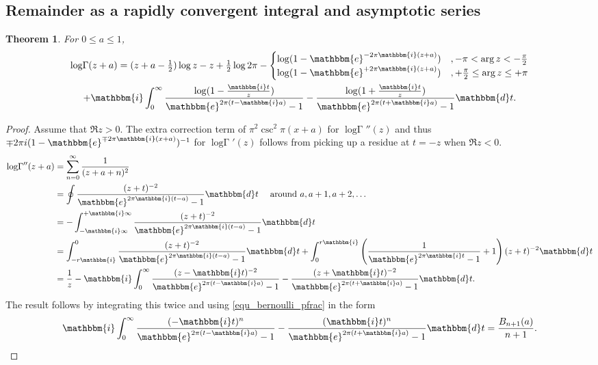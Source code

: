 \documentclass[12pt]{article}
\newcommand{\ee}[0] {\mathbbm{e}}
\newcommand{\ii}[0] {\mathbbm{i}}
\newcommand{\dd}[0] {\mathbbm{d}}
\newcommand{\op}[1]  { \operatorname{ #1 }}
\newcommand{\logG} {\operatorname {log \Gamma}}
\numberwithin{equation}{section}
\newtheorem{theorem}{Theorem}[section]
\begin{document}
\subsection{Remainder as a rapidly convergent integral and asymptotic series}
\begin{theorem}
For $0 \le a \le 1$,
\begin{gather*}
\logG(z+a) = (z+a-\tfrac{1}{2}) \log z - z + \tfrac{1}{2} \log 2\pi- \begin{cases} \log(1-\ee^{-2\pi \ii (z+a)})&, - \pi < \op{arg} z < -\frac{\pi}{2}\\
 \log(1-\ee^{+2\pi \ii (z+a)})&, +\frac{\pi}{2} \le \op{arg} z \le +\pi \end{cases} \\
 + \ii \int_{0}^{\infty} \frac{\log(1-\frac{\ii t}{z})}{\ee^{2\pi (t-\ii a)}-1}-\frac{\log(1+\frac{\ii t}{z})}{\ee^{2\pi (t+\ii a)}-1} \dd t\text{.}
\end{gather*}
\end{theorem}
\begin{proof}
Assume that $\Re z > 0$. The extra correction term of $\pi^2 \csc^2 \pi (x+a)$ for $\logG''(z)$ and thus $\mp 2 \pi i (1-\ee^{\mp 2\pi \ii (x+a)})^{-1}$ for $\logG'(z)$ follows from picking up a residue at $t=-z$ when $\Re z < 0$.
\begin{align*}
\logG''(z+a) &= \sum_{n=0}^{\infty}\frac{1}{(z+a+n)^2}\\
&= \oint \frac{(z+t)^{-2}}{\ee^{2\pi \ii (t-a)} - 1} \dd t \quad \text{ around  } a,a+1,a+2, \dots\\
&= -\int_{-\ii \infty}^{+\ii \infty} \frac{(z+t)^{-2}}{\ee^{2\pi \ii (t-a)} - 1} \dd t\\
&= \int_{-r \ii}^{0} \frac{(z+t)^{-2}}{\ee^{2\pi \ii (t-a)}-1} \dd t + \int_{0}^{r \ii} \left(\frac{1}{\ee^{2\pi \ii t}-1}+1\right) (z+t)^{-2} \dd t\\
&= \frac{1}{z} - \ii \int_{0}^{\infty} \frac{(z-\ii t)^{-2}}{\ee^{2\pi (t-\ii a)}-1} - \frac{(z+\ii t)^{-2}}{\ee^{2\pi (t+\ii a)}-1} \dd t\text{.}
\end{align*}
The result follows by integrating this twice and using \eqref{equ_bernoulli_pfrac} in the form
\begin{equation*}
\ii \int_{0}^{\infty} \frac{(-\ii t)^n}{\ee^{2\pi (t-\ii a)}-1} - \frac{(\ii t)^n}{\ee^{2\pi (t+\ii a)}-1} \dd t = \frac{B_{n+1}(a)}{n+1}\text{.}
\end{equation*}
\end{proof}
\end{document}
